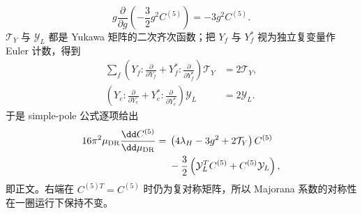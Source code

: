 \begin{derivation}
\begin{equation*}
 g\frac{\partial}{\partial g}
 \left(-\frac32g^2C^{(5)}\right)=-3g^2C^{(5)}.
\end{equation*}
$\mathcal T_Y$ 与 $\mathcal Y_L$ 都是 Yukawa 矩阵的二次齐次函数；把 $Y_f$ 与 $Y_f^*$ 视为独立复变量作 Euler 计数，得到
\begin{align*}
 \sum_f\left(Y_f\!:\frac{\partial}{\partial Y_f}
 +Y_f^*\!:\frac{\partial}{\partial Y_f^*}\right)\mathcal T_Y
 &=2\mathcal T_Y,\\
 \left(Y_e\!:\frac{\partial}{\partial Y_e}
 +Y_e^*\!:\frac{\partial}{\partial Y_e^*}\right)\mathcal Y_L
 &=2\mathcal Y_L.
\end{align*}
于是 simple-pole 公式逐项给出
\begin{align*}
 16\pi^2\mu_{\rm DR}\frac{\dd C^{(5)}}{\dd\mu_{\rm DR}}
 ={}&\left(4\lambda_H-3g^2+2\mathcal T_Y\right)C^{(5)}\\
 &-\frac32\left(\mathcal Y_L^TC^{(5)}+C^{(5)}\mathcal Y_L\right),
\end{align*}
即正文。右端在 $C^{(5)T}=C^{(5)}$ 时仍为复对称矩阵，所以 Majorana 系数的对称性在一圈运行下保持不变。
\end{derivation}

